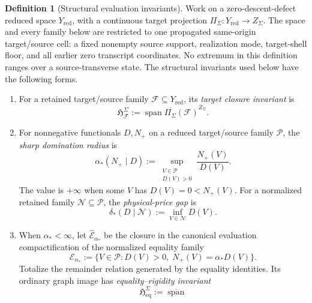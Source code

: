 \documentclass[11pt]{article}
\numberwithin{section}{part}
\theoremstyle{plain}
\theoremstyle{definition}
\newtheorem{definition}[definition]{Definition}
\theoremstyle{remark}
\begin{document}
\begin{definition}[Structural evaluation invariants]
\label{def:structural-evaluation-invariants}
Work on a zero-descent-defect reduced space \(Y_{\mathrm{red}}\), with a
continuous target projection \(\Pi_\Sigma:Y_{\mathrm{red}}\to Z_\Sigma\).
The space and every family below are restricted to one propagated
same-origin target/source cell: a fixed nonempty source support, realization
mode, target-shell floor, and all earlier zero transcript coordinates.  No
extremum in this definition ranges over a source-transverse state.
The structural invariants used below have the following forms.
\begin{enumerate}[label=\textup{(I\arabic*)}]
\item For a retained target/source family \(\mathcal F\subseteq Y_{\mathrm{red}}\), its
  \emph{target closure invariant} is
  \begin{equation}
   \label{eq:target-closure-invariant}
   \mathfrak H_{\mathcal F}^{\Sigma}
   :=\overline{\operatorname{span}
      \Pi_\Sigma(\mathcal F)}^{Z_\Sigma}.
  \end{equation}
\item For nonnegative functionals \(D,N_+\) on a reduced target/source family
  \(\mathcal P\), the \emph{sharp domination radius} is
  \begin{equation}
   \label{eq:sharp-domination-radius}
   \alpha_*(N_+\mid D)
   :=\sup_{\substack{V\in\mathcal P\\D(V)>0}}
       \frac{N_+(V)}{D(V)}.
  \end{equation}
  The value is \(+\infty\) when some \(V\) has \(D(V)=0<N_+(V)\).
  For a normalized retained family \(\mathcal N\subseteq\mathcal P\), the
  \emph{physical-price gap} is
  \begin{equation}
   \label{eq:sharp-physical-price-gap}
   \delta_*(D\mid\mathcal N):=\inf_{V\in\mathcal N}D(V).
  \end{equation}
\item When \(\alpha_*<\infty\), let
  \(\widehat{\mathcal E}_{\alpha_*}\) be the closure in the canonical
  evaluation compactification of the normalized equality family
  \[
   \mathcal E_{\alpha_*}
   :=\{V\in\mathcal P:D(V)>0,\;
        N_+(V)=\alpha_*D(V)\}.
  \]
  Totalize the remainder relation generated by the equality identities.  Its
  ordinary graph image has \emph{equality--rigidity invariant}
  \begin{equation}
   \label{eq:equality-rigidity-invariant}
   \mathfrak H_{\mathrm{eq}}^{\Sigma}
   :=\overline{\operatorname{span}
}
\end{equation}
\end{enumerate}
\end{definition}
\end{document}
